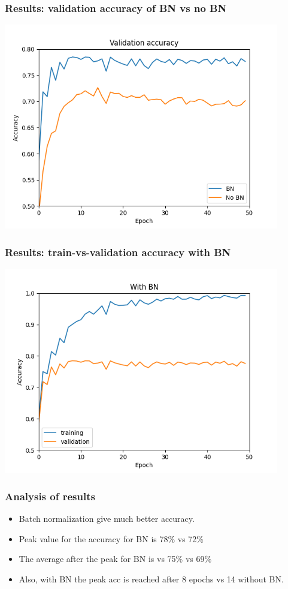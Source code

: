 \documentclass{beamer}
\begin{document}
\begin{frame}
    \frametitle{Results: validation accuracy of BN vs no BN}
    \begin{center}
        \includegraphics[width=0.9\textwidth]{figs/accuracy-BN-vs-NoBN.png}
    \end{center}
\end{frame}

\begin{frame}
    \frametitle{Results: train-vs-validation accuracy with BN}
    \begin{center}
        \includegraphics[width=0.9\textwidth]{figs/accuracy-t-vs-v-BN.png}
    \end{center}
\end{frame}


\begin{frame}
    \frametitle{Analysis of results}
\begin{itemize}
    \item Batch normalization give much better accuracy.
    \item Peak value for the accuracy  for BN is 78\% vs  72\%
    \item The average after the peak for BN is vs 75\% vs 69\%
    \item Also, with BN the peak acc is reached after 8 epochs vs 14 without BN.
\end{itemize}
    \end{frame}
\end{document}
